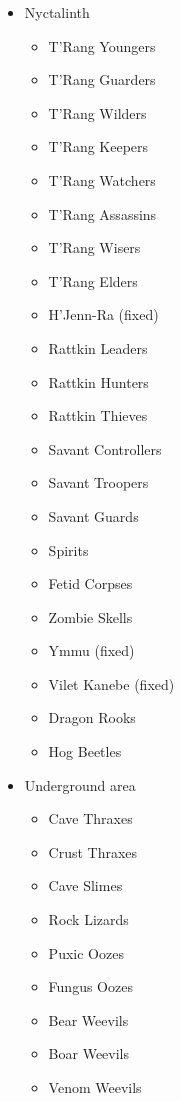 \documentclass[12pt]{article}
\providecommand{\tightlist}{%
  \setlength{\itemsep}{0pt}\setlength{\parskip}{0pt}}
\begin{document}
\begin{multicols}{2}
\begin{itemize}
\item Nyctalinth
  \begin{itemize}
    \tightlist
  \item T'Rang Youngers
  \item T'Rang Guarders
  \item T'Rang Wilders
  \item T'Rang Keepers
  \item T'Rang Watchers
  \item T'Rang Assassins
  \item T'Rang Wisers
  \item T'Rang Elders
  \item H'Jenn-Ra (fixed)
  \item Rattkin Leaders
  \item Rattkin Hunters
  \item Rattkin Thieves
  \item Savant Controllers
  \item Savant Troopers
  \item Savant Guards
  \item Spirits
  \item Fetid Corpses
  \item Zombie Skells
  \item Ymmu (fixed)
  \item Vilet Kanebe (fixed)
  \item Dragon Rooks
  \item Hog Beetles
  \end{itemize}

\item Underground area
  \begin{itemize}
    \tightlist
  \item Cave Thraxes
  \item Crust Thraxes
  \item Cave Slimes
  \item Rock Lizards
  \item Puxic Oozes
  \item Fungus Oozes
  \item Bear Weevils
  \item Boar Weevils
  \item Venom Weevils
  \end{itemize}
\end{itemize}
\end{multicols}
\end{document}
